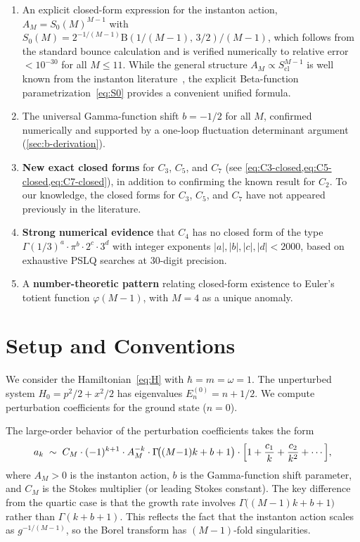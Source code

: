 \documentclass[12pt,a4paper]{article}
\numberwithin{equation}{section}
\theoremstyle{plain}
\theoremstyle{definition}
\theoremstyle{remark}
\newcommand{\BetaF}{\mathrm{B}}
\begin{document}
\begin{enumerate}[leftmargin=*]
\item An explicit closed-form expression for the instanton action,
  $A_M = S_0(M)^{M-1}$ with
  $S_0(M) = 2^{-1/(M-1)} \BetaF(1/(M{-}1),\,3/2)/(M{-}1)$,
  which follows from the standard bounce calculation and is verified
  numerically to relative error $< 10^{-30}$ for all $M \le 11$.
  While the general structure $A_M \propto S_{\mathrm{cl}}^{M-1}$ is well
  known from the instanton literature~\cite{BW1973,ZJ2004,Alvarez2004},
  the explicit Beta-function parametrization~\eqref{eq:S0} provides a
  convenient unified formula.

\item The universal Gamma-function shift $b = -1/2$ for all $M$, confirmed
  numerically and supported by a one-loop fluctuation determinant argument
  (\cref{sec:b-derivation}).

\item \textbf{New exact closed forms} for $C_3$, $C_5$, and $C_7$
  (see \cref{eq:C3-closed,eq:C5-closed,eq:C7-closed}), in addition to
  confirming the known result for $C_2$. To our knowledge, the closed
  forms for $C_3$, $C_5$, and $C_7$ have not appeared previously in the
  literature.

\item \textbf{Strong numerical evidence} that $C_4$ has no closed form
  of the type $\Gamma(1/3)^a \cdot \pi^b \cdot 2^c \cdot 3^d$ with
  integer exponents $|a|, |b|, |c|, |d| < 2000$, based on exhaustive
  PSLQ searches at 30-digit precision.

\item A \textbf{number-theoretic pattern} relating closed-form existence
  to Euler's totient function $\varphi(M{-}1)$, with $M = 4$ as a
  unique anomaly.
\end{enumerate}

\section{Setup and Conventions}
\label{sec:setup}

We consider the Hamiltonian~\eqref{eq:H} with $\hbar = m = \omega = 1$.
The unperturbed system $H_0 = p^2/2 + x^2/2$ has eigenvalues
$E_n^{(0)} = n + 1/2$. We compute perturbation coefficients for the
ground state ($n = 0$).

The large-order behavior of the perturbation coefficients takes the form
\begin{equation}\label{eq:large-order}
  a_k \;\sim\; C_M \cdot (-1)^{k+1} \cdot A_M^{-k}
  \cdot \Gamma\!\bigl((M{-}1)k + b + 1\bigr)
  \cdot \Bigl[1 + \frac{c_1}{k} + \frac{c_2}{k^2} + \cdots\Bigr],
\end{equation}
where $A_M > 0$ is the instanton action, $b$ is the Gamma-function shift
parameter, and $C_M$ is the Stokes multiplier (or leading Stokes constant).
The key difference from the quartic case is that the growth rate involves
$\Gamma\!\bigl((M{-}1)k + b + 1\bigr)$ rather than $\Gamma(k + b + 1)$.
This reflects the fact that the instanton action scales as
$g^{-1/(M-1)}$, so the Borel transform has $(M{-}1)$-fold singularities.
\end{document}
